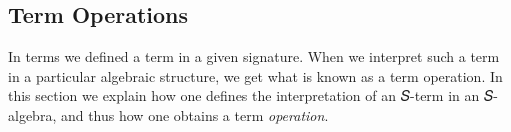 \documentclass[sigplan,screen]{acmart}
\begin{document}
\begin{comment}
\subsubsection{Essential arity}\label{essential-arity}
The definition of arity of an operation or term is a bit nuanced as the next example demonstrates.
\textbf{Example}.
\begin{quote}
Suppose 𝑓 is a binary term, and 𝑝 and 𝑞 are ternary terms. What is the arity of the following term?
\[𝑡(𝑢, 𝑣, 𝑤, 𝑥, 𝑦, 𝑧) = 𝑓(𝑝(𝑥, 𝑦, 𝑧), 𝑓(𝑤, 𝑥), 𝑞(𝑢, 𝑣, 𝑤))\]
On the face of it, it seems safe to say that 𝑡 has arity 6, since it is expressible as a function of 6 variables.

But what if we decided to throw in some useless (or ``dummy'') variables, like so,
\[t'(𝑢', 𝑣', 𝑢, 𝑣, 𝑤, 𝑥, 𝑦, 𝑧, 𝑧') = 𝑓(𝑝(𝑥, 𝑦, 𝑧), 𝑓(𝑤, 𝑥), 𝑞(𝑢, 𝑣, 𝑤))?\]

And what happens if \(𝑝(𝑥, 𝑦, 𝑧) = 𝑧\), so that 𝑝 depends on just one of its arguments? Then we could replace it with \(𝑝'(𝑧) = 𝑝(𝑥, 𝑦, 𝑧)\), and 𝑡 could be expressed as,
\[𝑡''(𝑢, 𝑣, 𝑤, 𝑥, 𝑧) = 𝑓(𝑝'(𝑧), 𝑓(𝑤, 𝑥), 𝑞(𝑢, 𝑣, 𝑤))).\]

The respective arities of \(𝑡, 𝑡'\) and \(𝑡''\) are 6, 9, and 5, yet arity1--arity3 merely give three different ways to present the term \(𝑓(𝑝(𝑥, 𝑦, 𝑧), 𝑓(𝑤, 𝑥), 𝑞(𝑢, 𝑣, 𝑤))\).
\end{quote}

As the example demonstrates, the notion of arity of a term is not uniquely defined (modulo equivalence of terms). As such, it is sometimes useful to speak of the \textbf{essential arity} of a term, which is defined to be the minimum number of variables required to express that term; it should be clear that this is equal to the number of arguments
with respect to which the term is not constant.
\textbf{Example}.
\begin{quote} It is impossible to know the essential arity of a term until we know
that of each of its subterms. Picking up where we left off in the previous example, suppose 𝑓 depends on both of its arguments and \(𝑞(𝑢, 𝑣, 𝑤) = 𝑓(𝑣, 𝑤)\). Then 𝑡 is expressible as
\[s(𝑣, 𝑤, 𝑥, 𝑧) = 𝑓(𝑝'(𝑧), 𝑓(𝑤, 𝑥), 𝑓(𝑣, 𝑤))\]
and we finally see the lower bound on the number of variables required to express 𝑡, namely 4. Therefore, 𝑡 has essential arity 4.
\end{quote}
\end{comment}

\subsection{Term Operations}\label{term-operations}
In terms we defined a term in a given signature. When we interpret such a term in a particular algebraic structure, we get what is known as a term operation. In this section we explain how one defines the interpretation of an 𝑆-term in an 𝑆-algebra, and thus how one obtains a term \emph{operation}.
\end{document}
